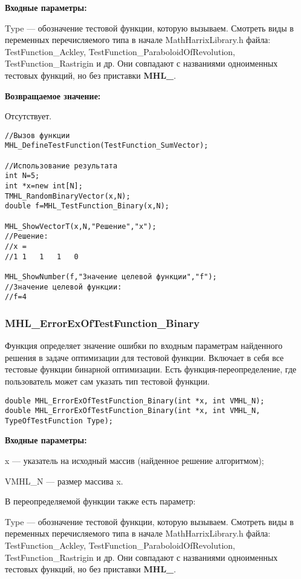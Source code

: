 \documentclass[a4paper,12pt]{article}
\begin{document}
\textbf{Входные параметры:}
  
Type --- обозначение тестовой функции, которую вызываем.
Смотреть виды в переменных перечисляемого типа в начале MathHarrixLibrary.h файла: TestFunction\_Ackley, TestFunction\_ParaboloidOfRevolution, TestFunction\_Rastrigin и др. Они совпадают с названиями одноименных тестовых функций, но без приставки \textbf{MHL\_}.

\textbf{Возвращаемое значение:}
 
Отсутствует.


\begin{lstlisting}[label=code_use_MHL_DefineTestFunction,caption=Пример использования]
//Вызов функции
MHL_DefineTestFunction(TestFunction_SumVector);

//Использование результата
int N=5;
int *x=new int[N];
TMHL_RandomBinaryVector(x,N);
double f=MHL_TestFunction_Binary(x,N);

MHL_ShowVectorT(x,N,"Решение","x");
//Решение:
//x =	
//1	1	1	1	0

MHL_ShowNumber(f,"Значение целевой функции","f");
//Значение целевой функции:
//f=4
\end{lstlisting}

\subsubsection{MHL\_ErrorExOfTestFunction\_Binary}\label{MHL_ErrorExOfTestFunction_Binary}

Функция определяет значение ошибки по входным параметрам найденного решения в задаче оптимизации для тестовой функции. Включает в себя все тестовые функции бинарной оптимизации. Есть функция-переопределение, где пользователь может сам указать тип тестовой функции.


\begin{lstlisting}[label=code_syntax_MHL_ErrorExOfTestFunction_Binary,caption=Синтаксис]
double MHL_ErrorExOfTestFunction_Binary(int *x, int VMHL_N);
double MHL_ErrorExOfTestFunction_Binary(int *x, int VMHL_N, TypeOfTestFunction Type);
\end{lstlisting}

\textbf{Входные параметры:}

x --- указатель на исходный массив (найденное решение алгоритмом);

VMHL\_N --- размер массива x.

В переопределяемой функции также есть параметр:
  
Type --- обозначение тестовой функции, которую вызываем.
Смотреть виды в переменных перечисляемого типа в начале MathHarrixLibrary.h файла: TestFunction\_Ackley, TestFunction\_ParaboloidOfRevolution, TestFunction\_Rastrigin и др. Они совпадают с названиями одноименных тестовых функций, но без приставки \textbf{MHL\_}.
\end{document}
